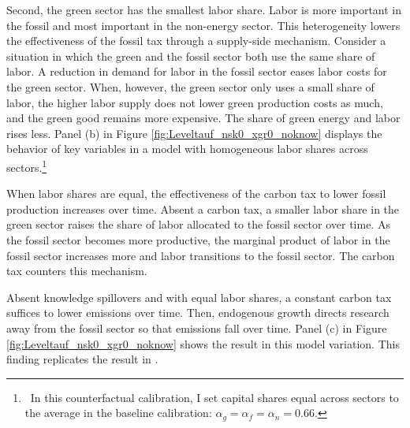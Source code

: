 Second, the green sector has the smallest labor share. Labor is more important in the fossil and most important in the non-energy sector. This heterogeneity lowers the effectiveness of the fossil tax through a supply-side mechanism. 
Consider a situation in which the green and the fossil sector both use the same share of labor. A reduction in demand for labor in the fossil sector eases labor costs for the green sector. When, however, the green sector only uses a small share of labor, the higher labor supply does not lower green production costs as much, and the green good remains more expensive. The share of green energy and labor rises less. Panel (b)  in Figure \ref{fig:Leveltauf_nsk0_xgr0_noknow} displays the behavior of key variables in a model with homogeneous labor shares across sectors.\footnote{\ In this counterfactual calibration, I set capital shares equal across sectors to the average in the baseline calibration: $\alpha_g=\alpha_f=\alpha_n=0.66$. }

When labor shares are equal, the effectiveness of the carbon tax to lower fossil production increases over time. 
Absent a carbon tax, a smaller labor share in the green sector raises the share of labor allocated to the fossil sector over time. As the fossil sector becomes more productive, the marginal product of labor in the fossil sector increases more and labor transitions to the fossil sector. The carbon tax counters this mechanism. %



Absent knowledge spillovers and with equal labor shares, a constant carbon tax suffices to lower emissions over time. Then, endogenous growth directs research away from the fossil sector so that emissions fall over time. Panel (c) in Figure \ref{fig:Leveltauf_nsk0_xgr0_noknow} shows the result in this model variation. This finding replicates the result in \cite{Acemoglu2012TheChange}.


